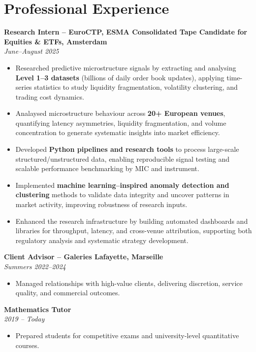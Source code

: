 \documentclass[a4paper,10pt]{article}
\begin{document}
\hfill
\begin{minipage}[t]{0.5\textwidth}

\section*{Professional Experience}

{\bfseries Research Intern – EuroCTP, ESMA Consolidated Tape Candidate for Equities \& ETFs, Amsterdam}~%
\\
\textit{June–August 2025}
\begin{itemize}
    \item Researched predictive microstructure signals by extracting and analysing \textbf{Level 1–3 datasets} (billions of daily order book updates), applying time-series statistics to study liquidity fragmentation, volatility clustering, and trading cost dynamics.  
\item Analaysed microstructure behaviour across \textbf{20+ European venues}, quantifying latency asymmetries, liquidity fragmentation, and volume concentration to generate systematic insights into market efficiency.
    \item Developed \textbf{Python pipelines and research tools} to process large-scale structured/unstructured data, enabling reproducible signal testing and scalable performance benchmarking by MIC and instrument.  
    \item Implemented \textbf{machine learning–inspired anomaly detection and clustering} methods to validate data integrity and uncover patterns in market activity, improving robustness of research inputs.  
    \item Enhanced the research infrastructure by building automated dashboards and libraries for throughput, latency, and cross-venue attribution, supporting both regulatory analysis and systematic strategy development.  
\end{itemize}



\vspace{0.6em}
\textbf{Client Advisor – Galeries Lafayette, Marseille} \\
\textit{Summers 2022–2024}
\begin{itemize}
    \item Managed relationships with high-value clients, delivering discretion, service quality, and commercial outcomes.
\end{itemize}

\vspace{0.4em}
\textbf{Mathematics Tutor}  \\
\textit{2019 – Today} 
\begin{itemize}
	\item Prepared students for competitive exams and university-level quantitative courses.
\end{itemize}


\end{minipage}
\end{document}
